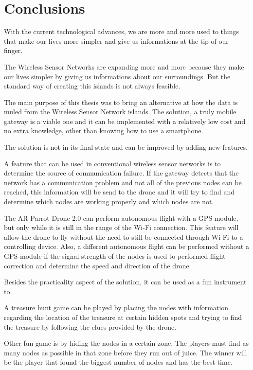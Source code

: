 \chapter{Conclusions}

With the current technological advances, we are more and more used to things that make our lives more simpler and give us informations at the tip of our finger. 

The Wireless Sensor Networks are expanding more and more because they make our lives simpler by giving us informations about our surroundings. But the standard way of creating this islands is not always feasible.

The main purpose of this thesis was to bring an alternative at how the data is muled from the Wireless Sensor Network islands. The solution, a truly mobile gateway is a viable one and it can be implemented with a relatively low cost and no extra knowledge, other than knowing how to use a smartphone.

The solution is not in its final state and can be improved by adding new features.

A feature that can be used in conventional wireless sensor networks is to determine the source of communication failure. If the gateway detects that the network has a communication problem and not all of the previous nodes can be reached, this information will be send to the drone and it will try to find and determine which nodes are working properly and which nodes are not.
 
The AR Parrot Drone 2.0 can perform autonomous flight with a GPS module, but only while it is still in the range of the Wi-Fi connection. This feature will allow the drone to fly without the need to still be connected through Wi-Fi to a controlling device. Also, a different autonomous flight can be performed without a GPS module if the signal strength of the nodes is used to performed flight correction and determine the speed and direction of the drone.


Besides the practicality aspect of the solution, it can be used as a fun instrument to. 

A treasure hunt game can be played by placing the nodes with information regarding the location of the treasure at certain hidden spots and trying to find the treasure by following the clues provided by the drone.

Other fun game is by hiding the nodes in a certain zone. The players must find as many nodes as possible in that zone before they run out of juice. The winner will be the player that found the biggest number of nodes and has the best time.
